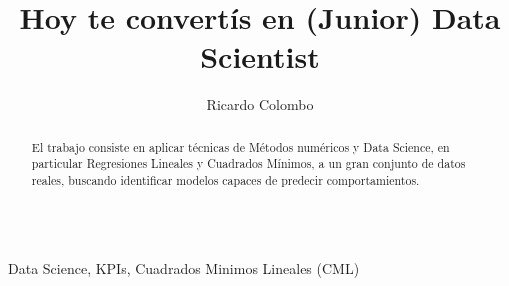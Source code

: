 \documentclass{endm}
\begin{document}
\begin{verbatim}\end{verbatim}\vspace{2.5cm}

\begin{frontmatter}

\title{Hoy te convertís en (Junior) Data Scientist}

\author{Ricardo Colombo}

\address{Departamento de Computaci\on\\ Universidad de Buenos Aires\\ C.A.B.A, Argentina}



\begin{abstract}
El trabajo consiste en aplicar técnicas de Métodos numéricos y 
Data Science, en particular Regresiones Lineales y Cuadrados Mínimos, 
a un gran conjunto de datos reales, buscando identificar modelos 
capaces de predecir comportamientos.
\end{abstract}

\begin{keyword}
Data Science, KPIs, Cuadrados Minimos Lineales (CML)
\end{keyword}

\end{frontmatter}
\end{document}
